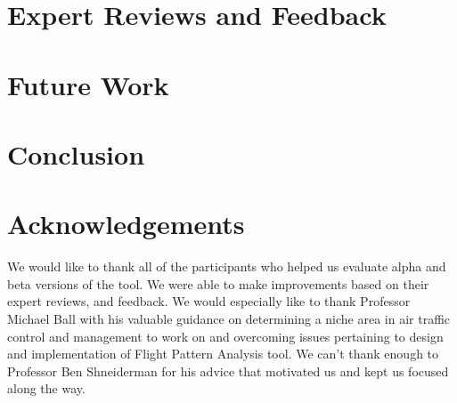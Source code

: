\documentclass{sig-alternate}
\begin{document}
\section{Expert Reviews and Feedback}
\label{sec-expert-review}

\section{Future Work}
\label{sec-future-work}

\section{Conclusion}
\label{sec-conclusion}

\section{Acknowledgements}
\label{sec-acknowledgements}
We would like to thank all of the
participants who helped us evaluate alpha and
beta versions of the tool. We were able to make
improvements based on their expert reviews,
and feedback. We would especially like to thank
Professor Michael Ball with his valuable guidance
on determining a niche area in air traffic control
and management to work on and overcoming issues
pertaining to design and implementation of Flight
Pattern Analysis tool. We can’t thank enough to
Professor Ben Shneiderman for his advice that
motivated us and kept us focused along the way.


\begin{small}

\end{small}
\end{document}
